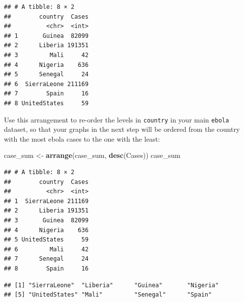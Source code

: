 \documentclass[]{book}
\makeatletter
\newenvironment{Shaded}{\begin{snugshade}}{\end{snugshade}}
\newcommand{\KeywordTok}[1]{\textcolor[rgb]{0.13,0.29,0.53}{\textbf{{#1}}}}
\newcommand{\DataTypeTok}[1]{\textcolor[rgb]{0.13,0.29,0.53}{{#1}}}
\newcommand{\StringTok}[1]{\textcolor[rgb]{0.31,0.60,0.02}{{#1}}}
\newcommand{\OtherTok}[1]{\textcolor[rgb]{0.56,0.35,0.01}{{#1}}}
\newcommand{\NormalTok}[1]{{#1}}
\newenvironment{kframe}{%
\medskip{}
\setlength{\fboxsep}{.8em}
 \def\at@end@of@kframe{}%
 \ifinner\ifhmode%
  \def\at@end@of@kframe{\end{minipage}}%
  \begin{minipage}{\columnwidth}%
 \fi\fi%
 \def\FrameCommand##1{\hskip\@totalleftmargin \hskip-\fboxsep
 \colorbox{shadecolor}{##1}\hskip-\fboxsep
     \hskip-\linewidth \hskip-\@totalleftmargin \hskip\columnwidth}%
 \MakeFramed {\advance\hsize-\width
   \@totalleftmargin\z@ \linewidth\hsize
   \@setminipage}}%
 {\par\unskip\endMakeFramed%
 \at@end@of@kframe}
\renewenvironment{Shaded}{\begin{kframe}}{\end{kframe}}
\makeatother
\begin{document}
\begin{Shaded}
\end{Shaded}

\begin{verbatim}
## # A tibble: 8 × 2
##        country  Cases
##          <chr>  <int>
## 1       Guinea  82099
## 2      Liberia 191351
## 3         Mali     42
## 4      Nigeria    636
## 5      Senegal     24
## 6  SierraLeone 211169
## 7        Spain     16
## 8 UnitedStates     59
\end{verbatim}

Use this arrangement to re-order the levels in \texttt{country} in your
main \texttt{ebola} dataset, so that your graphs in the next step will
be ordered from the country with the most ebola cases to the one with
the least:

\begin{Shaded}
\begin{Highlighting}[]
\NormalTok{case_sum <-}\StringTok{ }\KeywordTok{arrange}\NormalTok{(case_sum, }\KeywordTok{desc}\NormalTok{(Cases))}
\NormalTok{case_sum}
\end{Highlighting}
\end{Shaded}

\begin{verbatim}
## # A tibble: 8 × 2
##        country  Cases
##          <chr>  <int>
## 1  SierraLeone 211169
## 2      Liberia 191351
## 3       Guinea  82099
## 4      Nigeria    636
## 5 UnitedStates     59
## 6         Mali     42
## 7      Senegal     24
## 8        Spain     16
\end{verbatim}

\begin{Shaded}
\end{Shaded}

\begin{verbatim}
## [1] "SierraLeone"  "Liberia"      "Guinea"       "Nigeria"     
## [5] "UnitedStates" "Mali"         "Senegal"      "Spain"
\end{verbatim}
\end{document}
